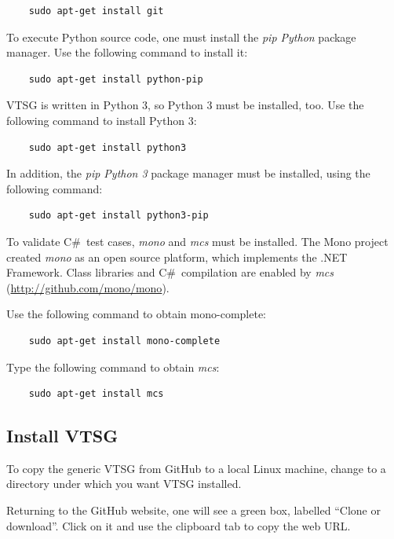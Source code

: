 \documentclass[12pt]{article}
\newcommand{\CSharp}{C{\fontseries{b}\selectfont\#}}
\begin{document}
\begin{verbatim}
    sudo apt-get install git    
\end{verbatim}

\noindent To execute Python source code, one must install the \emph{pip Python} package manager. Use the following command to install it:

\begin{verbatim}
    sudo apt-get install python-pip
\end{verbatim}

\noindent VTSG is written in Python 3, so Python 3 must be installed, too.
Use the following command to install Python 3:

\begin{verbatim}
    sudo apt-get install python3
\end{verbatim}

\noindent In addition, the \emph{pip Python 3} package manager must be installed, using the following command:

\begin{verbatim}
    sudo apt-get install python3-pip
\end{verbatim}

\noindent To validate \CSharp\ test cases, \emph{mono} and \emph{mcs} must be installed. The Mono project created \emph{mono} as an open source platform, which implements the .NET Framework. Class libraries and \CSharp\ compilation are enabled by \emph{mcs} (\href{http://github.com/mono/mono}{http://github.com/mono/mono}).

\noindent Use the following command to obtain mono-complete:

\begin{verbatim}
    sudo apt-get install mono-complete
\end{verbatim}

\noindent Type the following command to obtain \emph{mcs}:

\begin{verbatim}
    sudo apt-get install mcs
\end{verbatim}

\subsection{Install VTSG}

\noindent To copy the generic VTSG from GitHub to a local Linux machine, change to a
directory under which you want VTSG installed.

\noindent Returning to the GitHub website, one will see a green box, labelled ``Clone or download''. Click on it and use the clipboard tab to copy the web URL.
\end{document}
